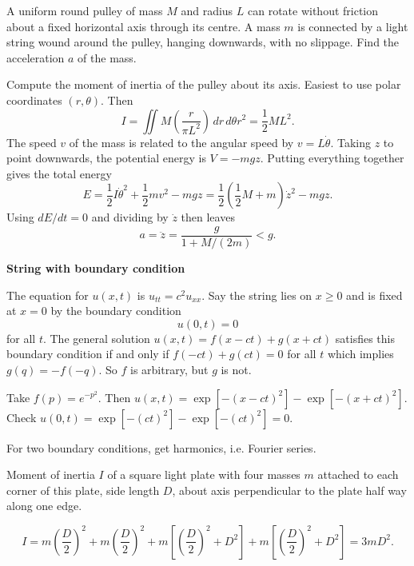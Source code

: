 \documentclass[10pt, a4paper]{article}
\begin{document}
\begin{example}
    A uniform round pulley of mass $M$ and radius $L$ can rotate without friction about a fixed horizontal axis through its centre.
    A mass $m$ is connected by a light string wound around the pulley,
    hanging downwards,
    with no slippage.
    Find the acceleration $a$ of the mass.

    \begin{solution}
        Compute the moment of inertia of the pulley about its axis.
        Easiest to use polar coordinates $(r, \theta)$.
        Then
        \[
        I = \iint M\left(\frac{r}{\pi L ^ 2}\right)\,dr\,d\theta r ^ 2 = \frac{1}{2}ML ^ 2.
        \]
        The speed $v$ of the mass is related to the angular speed by $v = L\dot{\theta}$.
        Taking $z$ to point downwards,
        the potential energy is $V = -mgz$.
        Putting everything together gives the total energy
        \[
        E = \frac{1}{2}I\dot{\theta} ^ 2 + \frac{1}{2}mv ^ 2 - mgz = \frac{1}{2}\left(\frac{1}{2}M + m\right)\dot{z} ^ 2 - mgz.
        \]
        Using $dE / dt = 0$ and dividing by $\dot{z}$ then leaves
        \[
        a = \ddot{z} = \frac{g}{1 + M / (2m)} < g.
        \]
    \end{solution}
\end{example}

\textbf{String with boundary condition}

The equation for $u(x, t)$ is $u_{tt} = c ^ 2u_{xx}$.
Say the string lies on $x \geq 0$ and is fixed at $x = 0$ by the boundary condition
\[
u(0, t) = 0
\]
for all $t$.
The general solution $u(x, t) = f(x - ct) + g(x + ct)$ satisfies this boundary condition if and only if $f(-ct) + g(ct) = 0$ for all $t$ which implies $g(q) = -f(-q)$.
So $f$ is arbitrary,
but $g$ is not.

\begin{example}
    Take $f(p) = e ^ {-p ^ 2}$.
    Then $u(x, t) = \exp[-(x - ct) ^ 2] - \exp[-(x + ct) ^ 2]$.
    Check $u(0, t) = \exp[-(ct) ^ 2] - \exp[-(ct) ^ 2] = 0$.
\end{example}

\begin{remark}
    For two boundary conditions,
    get harmonics,
    i.e. Fourier series.
\end{remark}

\begin{example}
    Moment of inertia $I$ of a square light plate with four masses $m$ attached to each corner of this plate,
    side length $D$,
    about axis perpendicular to the plate half way along one edge.

    \begin{solution}
        \[
        I = m\left(\frac{D}{2}\right) ^ 2 + m\left(\frac{D}{2}\right) ^ 2 + m\left[\left(\frac{D}{2}\right) ^ 2 + D ^ 2\right] + m\left[\left(\frac{D}{2}\right) ^ 2 + D ^ 2\right] = 3mD ^ 2.
        \]
    \end{solution}
\end{example}
\end{document}
